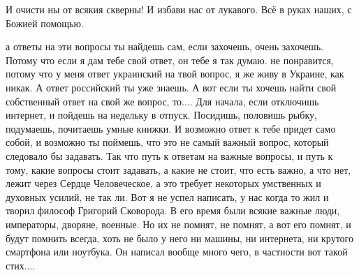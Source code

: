 И очисти ны от всякия скверны!
И избави нас от лукавого.
Всё в руках наших, с Божией помощью.

а ответы на эти вопросы ты найдешь сам, если захочешь, очень захочешь. Потому
что если я дам тебе свой ответ, он тебе я так думаю. не понравится, потому что
у меня ответ украинский на твой вопрос, я же живу в Украине, как никак. А ответ
российский ты уже знаешь. А вот если ты хочешь найти свой собственный ответ на
свой же вопрос, то.... Для начала, если отключишь интернет, и пойдешь на
недельку в отпуск. Посидишь, половишь рыбку, подумаешь, почитаешь умные книжки.
И возможно ответ к тебе придет само собой, и возможно ты поймешь, что это не
самый важный вопрос, который следовало бы задавать. Так что путь к ответам на
важные вопросы, и путь к тому, какие вопросы стоит задавать, а какие не стоит,
что есть важно, а что нет, лежит через Сердце Человеческое, а это требует
некоторых умственных и духовных усилий, не так ли. Вот я не успел написать, у
нас когда то жил и творил философ Григорий Сковорода. В его время были всякие
важные люди, императоры, дворяне, военные. Но их не помнят, не помнят, а вот
его помнят, и будут помнить всегда, хоть не было у него ни машины, ни
интернета, ни крутого смартфона или ноутбука. Он написал вообще много чего, в
частности вот такой стих....
